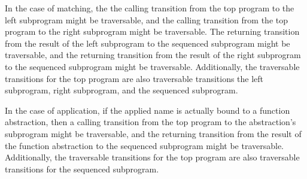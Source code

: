 \documentclass{article}
\begin{document}
In the case of matching, the the calling transition from the top program to
the left subprogram might be traversable, and
the calling transition from the top program to the
right subprogram might be traversable.  The returning transition from the result of the
left subprogram to the sequenced subprogram might be traversable, and the returning
transition from the result of the right subprogram to the sequenced subprogram might be
traversable.  Additionally, the traversable transitions for the top program are also
traversable transitions the left subprogram, right subprogram, and the sequenced subprogram.   

In the case of application, if the applied name is actually bound to a function
abstraction, then a calling transition from the top program to the abstraction's subprogram
might be traversable, and the returning transition from the result of the function
abstraction to the sequenced subprogram might be traversable.
Additionally, the traversable transitions for the top program are also
traversable transitions for the sequenced subprogram. 
\end{document}
